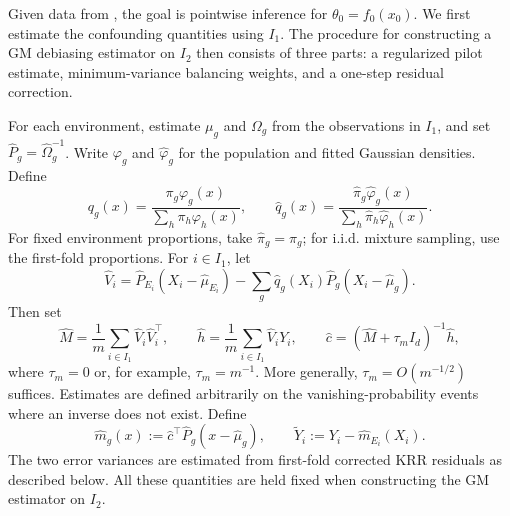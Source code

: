 \documentclass[11pt]{article}
\begin{document}
Given data from , the goal is pointwise inference for $\theta_0=f_0(x_0)$. We first estimate the confounding quantities using $I_1$. The procedure for constructing a GM debiasing estimator on $I_2$ then consists of three parts: a regularized pilot estimate, minimum-variance balancing weights, and a one-step residual correction.

For each environment, estimate $\mu_g$ and $\Omega_g$ from the observations in $I_1$, and set $\widehat P_g=\widehat\Omega_g^{-1}$. Write $\varphi_g$ and $\widehat\varphi_g$ for the population and fitted Gaussian densities. Define
\[
 q_g(x)=\frac{\pi_g\varphi_g(x)}{\sum_h\pi_h\varphi_h(x)},\qquad
 \widehat q_g(x)=\frac{\widehat\pi_g\widehat\varphi_g(x)}{\sum_h\widehat\pi_h\widehat\varphi_h(x)}.
\]
For fixed environment proportions, take $\widehat\pi_g=\pi_g$; for i.i.d. mixture sampling, use the first-fold proportions. For $i\in I_1$, let
\[
 \widehat V_i=\widehat P_{E_i}(X_i-\widehat\mu_{E_i})
 -\sum_g\widehat q_g(X_i)\widehat P_g(X_i-\widehat\mu_g).
\]
Then set
\begin{equation}
 \widehat M=\frac1m\sum_{i\in I_1}\widehat V_i\widehat V_i^\top,
 \qquad \widehat h=\frac1m\sum_{i\in I_1}\widehat V_iY_i,
 \qquad \widehat c=(\widehat M+\tau_m I_d)^{-1}\widehat h,
 \label{eq:nuisance_estimation}
\end{equation}
where $\tau_m=0$ or, for example, $\tau_m=m^{-1}$. More generally, $\tau_m=O(m^{-1/2})$ suffices. Estimates are defined arbitrarily on the vanishing-probability events where an inverse does not exist. Define
\[
 \widehat m_g(x):=\widehat c^\top\widehat P_g(x-\widehat\mu_g),
 \qquad \widetilde Y_i:=Y_i-\widehat m_{E_i}(X_i).
\]
The two error variances are estimated from first-fold corrected KRR residuals as described below. All these quantities are held fixed when constructing the GM estimator on $I_2$.
\end{document}
